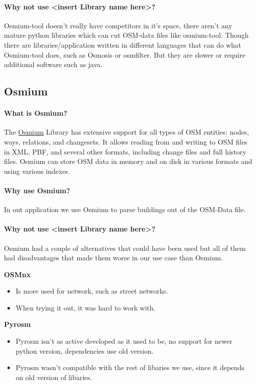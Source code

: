\documentclass[letterpaper,10pt,english]{sphinxmanual}
\begin{document}
\paragraph{Why not use <insert Library name here>?}
Osmium-tool doesn't really have competitors in it's space, there aren't any mature python libraries which can cut OSM-data files like osmium-tool.
Though there are libraries/application written in different languages that can do what Osmium-tool does, such as Osmosis or osmfilter.
But they are slower or require additional software such as java.


\subsection{Osmium}

\paragraph{What is Osmium?}
The \href{https://osmcode.org/libosmium/}{Osmium} Library has extensive support for all types of OSM entities: nodes, ways, relations, and changesets. It allows reading from and writing to OSM files in XML, PBF, and several other formats, including change files and full history files. Osmium can store OSM data in memory and on disk in various formats and using various indexes.

\paragraph{Why use Osmium?}
In out application we use Osmium to parse buildings out of the OSM-Data file.

\paragraph{Why not use <insert Library name here>?}
Osmium had a couple of alternatives that could have been used but all of them had disadvantages that made them worse in our use case than Osmium. 
  
\textbf{OSMnx}
\begin{itemize}
    \item Is more used for network, such as street networks. 
    \item When trying it out, it was hard to work with.
\end{itemize}


\textbf{Pyrosm}
\begin{itemize}
    \item Pyrosm isn't as active developed as it used to be, no support for newer python version, dependencies use old version.
    \item Pyrosm wasn't compatible with the rest of libaries we use, since it depends on old version of libaries.
\end{itemize}
\end{document}
